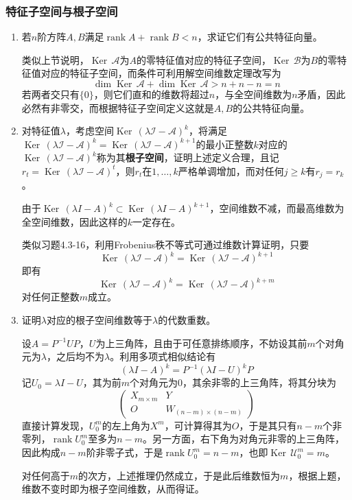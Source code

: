 \documentclass[a4paper,UTF8,fontset=windows]{ctexart}
\DeclareMathOperator{\rank}{rank}
\DeclareMathOperator{\Ker}{Ker\,}
\newcommand*{\ma}{\mathcal{A}}
\newcommand*{\mb}{\mathcal{B}}
\newcommand*{\mi}{\mathcal{I}}
\begin{document}
\subsubsection{特征子空间与根子空间}
\begin{enumerate}
    \item 若$n$阶方阵$A,B$满足$\rank A+\rank B<n$，求证它们有公共特征向量。
    
    类似上节说明，$\Ker\ma$为$A$的零特征值对应的特征子空间，$\Ker\mb$为$B$的零特征值对应的特征子空间，而条件可利用解空间维数定理改写为
    $$\dim\Ker\ma+\dim\Ker\ma>n+n-n=n$$
    若两者交只有$\{0\}$，则它们直和的维数将超过$n$，与全空间维数为$n$矛盾，因此必然有非零交，而根据特征子空间定义这就是$A,B$的公共特征向量。

    \item 对特征值$\lambda$，考虑空间$\Ker(\lambda\mi-\ma)^k$，将满足$\Ker(\lambda\mi-\ma)^k=\Ker(\lambda\mi-\ma)^{k+1}$的最小正整数$k$对应的$\Ker(\lambda\mi-\ma)^k$称为其\textbf{根子空间}，证明上述定义合理，且记$r_t=\Ker(\lambda\mi-\ma)^t$，则$r_t$在$1,\dots,k$严格单调增加，而对任何$j\ge k$有$r_j=r_k$。
    
    由于$\Ker(\lambda I-A)^k\subset\Ker(\lambda I-A)^{k+1}$，空间维数不减，而最高维数为全空间维数，因此这样的$k$一定存在。

    类似习题4.3-16，利用Frobenius秩不等式可通过维数计算证明，只要
    $$\Ker(\lambda\mi-\ma)^k=\Ker(\lambda\mi-\ma)^{k+1}$$
    即有
    $$\Ker(\lambda\mi-\ma)^k=\Ker(\lambda\mi-\ma)^{k+m}$$
    对任何正整数$m$成立。

    \item  证明$\lambda$对应的根子空间维数等于$\lambda$的代数重数。
    
    设$A=P^{-1}UP$，$U$为上三角阵，且由于可任意排练顺序，不妨设其前$m$个对角元为$\lambda$，之后均不为$\lambda$。利用多项式相似结论有
    $$(\lambda I-A)^k=P^{-1}(\lambda I-U)^kP$$
    记$U_0=\lambda I-U$，其为前$m$个对角元为0，其余非零的上三角阵，将其分块为
    $$\begin{pmatrix}X_{m\times m}&Y\\O&W_{(n-m)\times(n-m)}\end{pmatrix}$$
    直接计算发现，$U_0^m$的左上角为$X^m$，可计算得其为$O$，于是其只有$n-m$个非零列，$\rank U_0^m$至多为$n-m$。另一方面，右下角为对角元非零的上三角阵，因此构成$n-m$阶非零子式，于是$\rank U_0^m=n-m$，也即$\Ker\mathcal{U}_0^m=m$。

    对任何高于$m$的次方，上述推理仍然成立，于是此后维数恒为$m$，根据上题，维数不变时即为根子空间维数，从而得证。


\end{enumerate}
\end{document}
